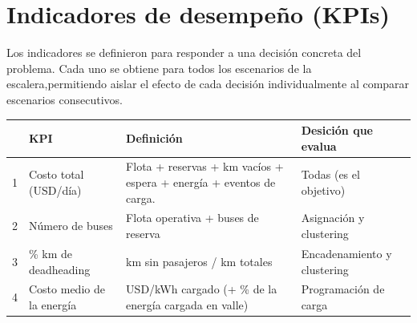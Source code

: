 \section{Indicadores de desempeño (KPIs)}
\label{sec:kpis-informe2}
 Los indicadores se definieron para responder a una decisión concreta del problema. Cada uno se obtiene para todos los escenarios de la escalera,permitiendo aislar el efecto de cada decisión individualmente al comparar escenarios consecutivos.

\begin{center}
    \begin{tabular}{|p{1cm}|p{5cm}|p{5cm}|p{5cm}|}
    \hline
     & KPI & Definición & Desición que evalua \\
    \hline
    1 & Costo total (USD/día) & Flota + reservas + km vacíos + espera + energía + eventos de carga. & Todas (es el objetivo)\\
    \hline
    2 & Número de buses & Flota operativa + buses de reserva & 	Asignación y clustering \\
    \hline
    3 & \% km de deadheading & 	km sin pasajeros / km totales & Encadenamiento y clustering\\
    \hline
    4 & Costo medio de la energía & USD/kWh cargado (+ \% de la energía cargada en valle) & Programación de carga \\
    \hline
    \end{tabular}
    \end{center}
